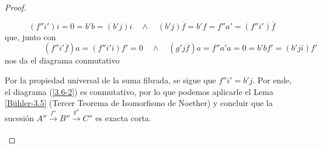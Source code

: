 \documentclass[tesis]{subfiles}
\begin{document}
\begin{proof}
\begin{enumerate}[label=(\alph*)]
             \[
                 (f''i')i=0=b'b=(b'j)i \quad \land \quad (b'j)\overline{f} = b'f = f''a' = (f''i')\overline{f}
             \] 
             que, junto con
             \[
                 \hspace{2cm} (f''i' \overline{f})a = (f''i'i)f' = 0 \quad \land \quad (g'j\overline{f})a = f''a'a = 0 = b'bf' = (b'ji)f'
             \] 
             nos da el diagrama conmutativo
             \begin{center}
             \end{center}
             Por la propiedad universal de la suma fibrada, se sigue que $f''i'=b'j$. Por ende, el diagrama (\ref{3.6-2}) es conmutativo, por lo que podemos aplicarle el Lema \ref{Bühler-3.5} (Tercer Teorema de Isomorfismo de Noether) y concluir que la sucesión $A''\xrightarrow[]{f''}B''\xrightarrow[]{g''}C''$ es exacta corta.


\end{enumerate}
\end{proof}
\end{document}
